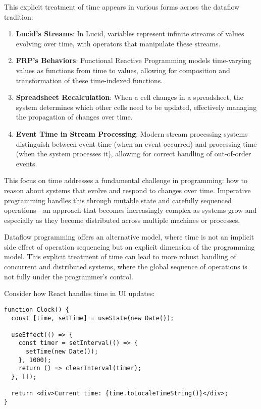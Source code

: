 \documentclass[11pt]{article}
\begin{document}
This explicit treatment of time appears in various forms across the dataflow tradition:

\begin{enumerate}
\item \textbf{Lucid's Streams}: In Lucid, variables represent infinite streams of values evolving over time, with operators that manipulate these streams.

\item \textbf{FRP's Behaviors}: Functional Reactive Programming models time-varying values as functions from time to values, allowing for composition and transformation of these time-indexed functions.

\item \textbf{Spreadsheet Recalculation}: When a cell changes in a spreadsheet, the system determines which other cells need to be updated, effectively managing the propagation of changes over time.

\item \textbf{Event Time in Stream Processing}: Modern stream processing systems distinguish between event time (when an event occurred) and processing time (when the system processes it), allowing for correct handling of out-of-order events.
\end{enumerate}

This focus on time addresses a fundamental challenge in programming: how to reason about systems that evolve and respond to changes over time. Imperative programming handles this through mutable state and carefully sequenced operations—an approach that becomes increasingly complex as systems grow and especially as they become distributed across multiple machines or processes.

Dataflow programming offers an alternative model, where time is not an implicit side effect of operation sequencing but an explicit dimension of the programming model. This explicit treatment of time can lead to more robust handling of concurrent and distributed systems, where the global sequence of operations is not fully under the programmer's control.

Consider how React handles time in UI updates:

\begin{verbatim}
function Clock() {
  const [time, setTime] = useState(new Date());

  useEffect(() => {
    const timer = setInterval(() => {
      setTime(new Date());
    }, 1000);
    return () => clearInterval(timer);
  }, []);

  return <div>Current time: {time.toLocaleTimeString()}</div>;
}
\end{verbatim}
\end{document}
